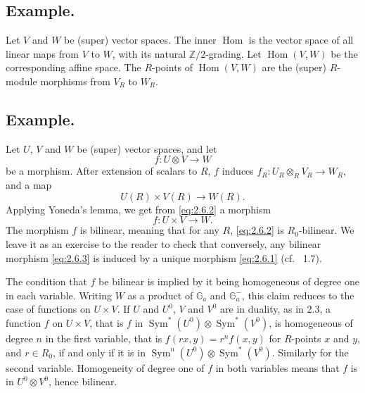 \documentclass[11pt,a4paper]{article}
\theoremstyle{plain}
\theoremstyle{definition}
\DeclareMathOperator{\Hom}{Hom}
\DeclareMathOperator{\Sym}{Sym}
\newcommand{\Z}{\mathbb{Z}}
\begin{document}
\subsection{Example.}
Let $V$ and $W$ be (super) vector spaces. The inner $\Hom$ is the vector space of all linear maps from $V$ to $W$, with its natural $\Z/2$-grading. Let $\Hom(V,W)$ be the corresponding affine space. The $R$-points of $\Hom(V,W)$ are the (super) $R$-module morphisms from $V_R$ to $W_R$.

\subsection{Example.}
\label{sec:2.6}
Let $U$, $V$ and $W$ be (super) vector spaces, and let
\begin{equation}\label{eq:2.6.1}
f : U \otimes V \to W
\end{equation}
be a morphism. After extension of scalars to $R$, $f$ induces $f_R : U_R \otimes_R V_R \to W_R$, and a map
\begin{equation}\label{eq:2.6.2}
U(R) \times V(R) \to W(R).
\end{equation}
Applying Yoneda's lemma, we get from \eqref{eq:2.6.2} a morphism
\begin{equation}\label{eq:2.6.3}
f : U \times V \to W.
\end{equation}
The morphism $f$ is bilinear, meaning that for any $R$, \eqref{eq:2.6.2} is $R_0$-bilinear. We leave it as an exercise to the reader to check that conversely, any bilinear morphism \eqref{eq:2.6.3} is induced by a unique morphism \eqref{eq:2.6.1} (cf.\ \cite{DM99} 1.7).

The condition that $f$ be bilinear is implied by it being homogeneous of degree one in each variable. Writing $W$ as a product of $\mathbb{G}_a$ and $\mathbb{G}_a^-$, this claim reduces to the case of functions on $U \times V$. If $U$ and $U^0$, $V$ and $V^0$ are in duality, as in 2.3, a function $f$ on $U \times V$, that is $f$ in $\Sym^*(U^0) \otimes \Sym^*(V^0)$, is homogeneous of degree $n$ in the first variable, that is $f(rx, y) = r^n f(x,y)$ for $R$-points $x$ and $y$, and $r \in R_0$, if and only if it is in $\Sym^n(U^0) \otimes \Sym^*(V^0)$. Similarly for the second variable. Homogeneity of degree one of $f$ in both variables means that $f$ is in $U^0 \otimes V^0$, hence bilinear.
\end{document}
